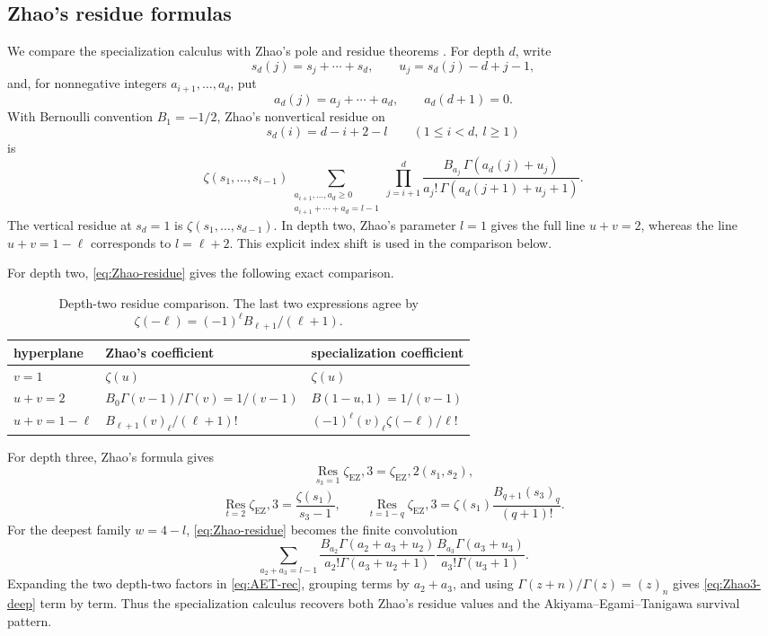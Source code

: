 \documentclass[11pt]{article}
\renewcommand{\boxed}[1]{#1}
\newcommand{\Res}{\operatorname*{Res}}
\newcommand{\EZ}{\zeta_{\mathrm{EZ}}}
\begin{document}
\subsection{Zhao's residue formulas}
\label{subsec:Zhao-comparison}

We compare the specialization calculus with Zhao's pole and residue
theorems \cite[Theorems~5 and~7]{Zhao2000}.  For depth \(d\), write
\[
 s_d(j)=s_j+\cdots+s_d,\qquad
 u_j=s_d(j)-d+j-1,
\]
and, for nonnegative integers \(a_{i+1},\ldots,a_d\), put
\[
 a_d(j)=a_j+\cdots+a_d,\qquad a_d(d+1)=0.
\]
With Bernoulli convention \(B_1=-1/2\), Zhao's nonvertical residue on
\[
 s_d(i)=d-i+2-l\qquad(1\le i<d,\ l\ge1)
\]
is
\begin{equation}\label{eq:Zhao-residue}
\boxed{
 \zeta(s_1,\ldots,s_{i-1})
 \sum_{\substack{a_{i+1},\ldots,a_d\ge0\\
                  a_{i+1}+\cdots+a_d=l-1}}
 \prod_{j=i+1}^{d}
 \frac{B_{a_j}\,\Gamma(a_d(j)+u_j)}
      {a_j!\,\Gamma(a_d(j+1)+u_j+1)}.}
\end{equation}
The vertical residue at \(s_d=1\) is
\(\zeta(s_1,\ldots,s_{d-1})\).  In depth two, Zhao's parameter
\(l=1\) gives the full line \(u+v=2\), whereas the line
\(u+v=1-\ell\) corresponds to \(l=\ell+2\).  This explicit index shift
is used in the comparison below.

For depth two, \eqref{eq:Zhao-residue} gives the following exact
comparison.
\begin{table}[ht]
\centering
\small
\begin{tabularx}{\textwidth}{@{}l X X@{}}
\toprule
hyperplane & Zhao's coefficient & specialization coefficient\\
\midrule
\(v=1\) & \(\zeta(u)\) & \(\zeta(u)\)\\
\(u+v=2\) & \(B_0\Gamma(v-1)/\Gamma(v)=1/(v-1)\)
 & \(B(1-u,1)=1/(v-1)\)\\
\(u+v=1-\ell\) &
 \(B_{\ell+1}(v)_\ell/(\ell+1)!\) &
 \((-1)^\ell(v)_\ell\zeta(-\ell)/\ell!\)\\
\bottomrule
\end{tabularx}
\caption{Depth-two residue comparison.  The last two expressions agree by
\(\zeta(-\ell)=(-1)^\ell B_{\ell+1}/(\ell+1)\).}
\label{tab:Zhao2}
\end{table}

For depth three, Zhao's formula gives
\[
 \Res_{s_3=1}\EZ,3=\EZ,2(s_1,s_2),
\]
\[
 \Res_{t=2}\EZ,3=\frac{\zeta(s_1)}{s_3-1},
 \qquad
 \Res_{t=1-q}\EZ,3
 =\zeta(s_1)\frac{B_{q+1}(s_3)_q}{(q+1)!}.
\]
For the deepest family \(w=4-l\), \eqref{eq:Zhao-residue} becomes the
finite convolution
\begin{equation}\label{eq:Zhao3-deep}
\boxed{
 \sum_{a_2+a_3=l-1}
 \frac{B_{a_2}\Gamma(a_2+a_3+u_2)}
      {a_2!\Gamma(a_3+u_2+1)}
 \frac{B_{a_3}\Gamma(a_3+u_3)}
      {a_3!\Gamma(u_3+1)}.}
\end{equation}
Expanding the two depth-two factors in \eqref{eq:AET-rec}, grouping
terms by \(a_2+a_3\), and using
\(\Gamma(z+n)/\Gamma(z)=(z)_n\) gives
\eqref{eq:Zhao3-deep} term by term.  Thus the specialization calculus
recovers both Zhao's residue values and the Akiyama--Egami--Tanigawa
survival pattern.
\end{document}
